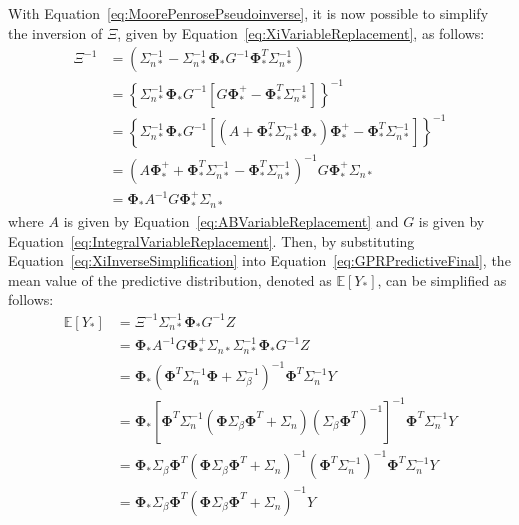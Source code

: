 \documentclass{article}
\begin{document}
With Equation~\eqref{eq:MoorePenrosePseudoinverse}, it is now possible to simplify the inversion of $\Xi$, given by Equation~\eqref{eq:XiVariableReplacement}, as follows:
\begin{equation}
\label{eq:XiInverseSimplification}
	\begin{aligned}
	\Xi^{-1} &= \left(\Sigma_{n*}^{-1} - \Sigma_{n*}^{-1} \mathbf{\Phi}_* G^{-1} \mathbf{\Phi}_*^T \Sigma_{n*}^{-1}\right) \\
	&= \left\lbrace\Sigma_{n*}^{-1} \mathbf{\Phi}_* G^{-1} \left[G \mathbf{\Phi}_*^+ - \mathbf{\Phi}_*^T \Sigma_{n*}^{-1}\right]\right\rbrace^{-1} \\
	&= \left\lbrace\Sigma_{n*}^{-1} \mathbf{\Phi}_* G^{-1} \left[\left(A + \mathbf{\Phi}_*^T \Sigma_{n*}^{-1} \mathbf{\Phi}_*\right) \mathbf{\Phi}_*^+ - \mathbf{\Phi}_*^T \Sigma_{n*}^{-1}\right]\right\rbrace^{-1} \\
	&= \left(A \mathbf{\Phi}_*^+ + \mathbf{\Phi}_*^T \Sigma_{n*}^{-1} - \mathbf{\Phi}_*^T \Sigma_{n*}^{-1}\right)^{-1} G \mathbf{\Phi}_*^+ \Sigma_{n*} \\
	&= \mathbf{\Phi}_* A^{-1} G \mathbf{\Phi}_*^+ \Sigma_{n*}
	\end{aligned}
\end{equation}
where $A$ is given by Equation~\eqref{eq:ABVariableReplacement} and $G$ is given by Equation~\eqref{eq:IntegralVariableReplacement}. Then, by substituting Equation~\eqref{eq:XiInverseSimplification} into Equation~\eqref{eq:GPRPredictiveFinal}, the mean value of the predictive distribution, denoted as $\mathbb{E}\!\left[Y_*\right]$, can be simplified as follows:
\begin{equation}
\label{eq:GPRPredictiveMean}
	\begin{aligned}
	\mathbb{E}\!\left[Y_*\right] &= \Xi^{-1} \Sigma_{n*}^{-1} \mathbf{\Phi}_* G^{-1} Z \\
	&= \mathbf{\Phi}_* A^{-1} G \mathbf{\Phi}_*^+ \Sigma_{n*} \Sigma_{n*}^{-1} \mathbf{\Phi}_* G^{-1} Z \\
	&= \mathbf{\Phi}_* \left(\mathbf{\Phi}^T \Sigma_n^{-1} \mathbf{\Phi} + \Sigma_\beta^{-1}\right)^{-1} \mathbf{\Phi}^T \Sigma_n^{-1} Y \\
	&= \mathbf{\Phi}_* \left[\mathbf{\Phi}^T \Sigma_n^{-1} \left(\mathbf{\Phi} \Sigma_\beta \mathbf{\Phi}^T + \Sigma_n\right) \left(\Sigma_\beta \mathbf{\Phi}^T\right)^{-1}\right]^{-1} \mathbf{\Phi}^T \Sigma_n^{-1} Y \\
	&= \mathbf{\Phi}_* \Sigma_\beta \mathbf{\Phi}^T \left(\mathbf{\Phi} \Sigma_\beta \mathbf{\Phi}^T + \Sigma_n\right)^{-1} \left(\mathbf{\Phi}^T \Sigma_n^{-1}\right)^{-1} \mathbf{\Phi}^T \Sigma_n^{-1} Y \\
	&= \mathbf{\Phi}_* \Sigma_\beta \mathbf{\Phi}^T \left(\mathbf{\Phi} \Sigma_\beta \mathbf{\Phi}^T + \Sigma_n\right)^{-1} Y
	\end{aligned}
\end{equation}
\end{document}
